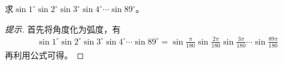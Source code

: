  \begin{example}
   求$\sin1^\circ \sin2^\circ \sin3^\circ \sin4^\circ \cdots \sin89^\circ$。
 \end{example}
 \begin{proof}[提示]
   首先将角度化为弧度，有
   \begin{align*}
     \sin1^\circ \sin2^\circ \sin3^\circ \sin4^\circ \cdots \sin89^\circ
     = \sin\frac{\pi}{180} \sin\frac{2\pi}{180} \sin\frac{3\pi}{180} \cdots \sin\frac{89\pi}{180}
   \end{align*}
   再利用公式可得。
 \end{proof}

